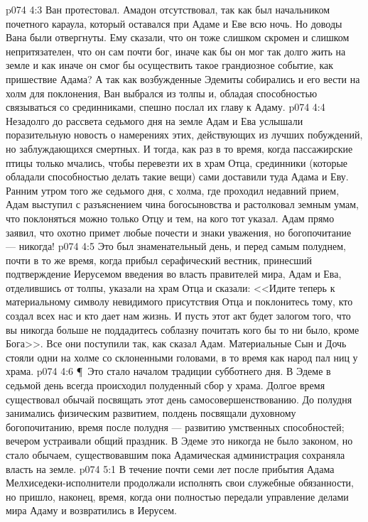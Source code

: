 \vs p074 4:3 Ван протестовал. Амадон отсутствовал, так как был начальником почетного караула, который оставался при Адаме и Еве всю ночь. Но доводы Вана были отвергнуты. Ему сказали, что он тоже слишком скромен и слишком непритязателен, что он сам почти бог, иначе как бы он мог так долго жить на земле и как иначе он смог бы осуществить такое грандиозное событие, как пришествие Адама? А так как возбужденные Эдемиты собирались и его вести на холм для поклонения, Ван выбрался из толпы и, обладая способностью связываться со срединниками, спешно послал их главу к Адаму.
\vs p074 4:4 Незадолго до рассвета седьмого дня на земле Адам и Ева услышали поразительную новость о намерениях этих, действующих из лучших побуждений, но заблуждающихся смертных. И тогда, как раз в то время, когда пассажирские птицы только мчались, чтобы перевезти их в храм Отца, срединники (которые обладали способностью делать такие вещи) сами доставили туда Адама и Еву. Ранним утром того же седьмого дня, с холма, где проходил недавний прием, Адам выступил с разъяснением чина богосыновства и растолковал земным умам, что поклоняться можно только Отцу и тем, на кого тот указал. Адам прямо заявил, что охотно примет любые почести и знаки уважения, но богопочитание --- никогда!
\vs p074 4:5 Это был знаменательный день, и перед самым полуднем, почти в то же время, когда прибыл серафический вестник, принесший подтверждение Иерусемом введения во власть правителей мира, Адам и Ева, отделившись от толпы, указали на храм Отца и сказали: <<Идите теперь к материальному символу невидимого присутствия Отца и поклонитесь тому, кто создал всех нас и кто дает нам жизнь. И пусть этот акт будет залогом того, что вы никогда больше не поддадитесь соблазну почитать кого бы то ни было, кроме Бога>>. Все они поступили так, как сказал Адам. Материальные Сын и Дочь стояли одни на холме со склоненными головами, в то время как народ пал ниц у храма.
\vs p074 4:6 \P\ Это стало началом традиции субботнего дня. В Эдеме в седьмой день всегда происходил полуденный сбор у храма. Долгое время существовал обычай посвящать этот день самосовершенствованию. До полудня занимались физическим развитием, полдень посвящали духовному богопочитанию, время после полудня --- развитию умственных способностей; вечером устраивали общий праздник. В Эдеме это никогда не было законом, но стало обычаем, существовавшим пока Адамическая администрация сохраняла власть на земле.
\vs p074 5:1 В течение почти семи лет после прибытия Адама Мелхиседеки\hyp{}исполнители продолжали исполнять свои служебные обязанности, но пришло, наконец, время, когда они полностью передали управление делами мира Адаму и возвратились в Иерусем.
